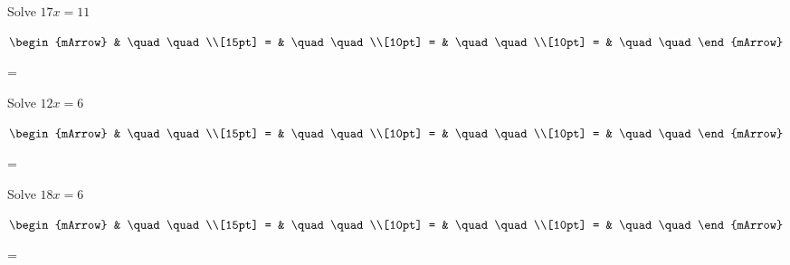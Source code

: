 \begin{mtask}[resume]
   \task \begin{exercise} Solve $ 17x = 11 $
           \begin{envSolution}
             $\begin{mArrow} 
			       & \quad \quad              \\[15pt]
                 = & \quad \quad              \\[10pt]
		   		 = & \quad \quad              \\[10pt]
				 = & \quad \quad 
              \end{mArrow}$
            \begin{shortsolution}  
			     =$ \quad \quad \quad \quad$
			\end{shortsolution}				 
           \end{envSolution}
         \end{exercise}
   \task \begin{exercise} Solve $ 12x = 6 $
           \begin{envSolution}
             $\begin{mArrow} 
			       & \quad \quad              \\[15pt]
                 = & \quad \quad              \\[10pt]
		   		 = & \quad \quad              \\[10pt]
				 = & \quad \quad 
              \end{mArrow}$
            \begin{shortsolution}  
			     =$ \quad \quad \quad \quad$
			\end{shortsolution}				 
           \end{envSolution}
         \end{exercise}
   \task \begin{exercise} Solve $ 18x = 6 $
           \begin{envSolution}
             $\begin{mArrow} 
			       & \quad \quad              \\[15pt]
                 = & \quad \quad              \\[10pt]
		   		 = & \quad \quad              \\[10pt]
				 = & \quad \quad 
              \end{mArrow}$
            \begin{shortsolution}  
			     =$ \quad \quad \quad \quad$
			\end{shortsolution}				 

\end{envSolution}
\end{exercise}
\end{mtask}
